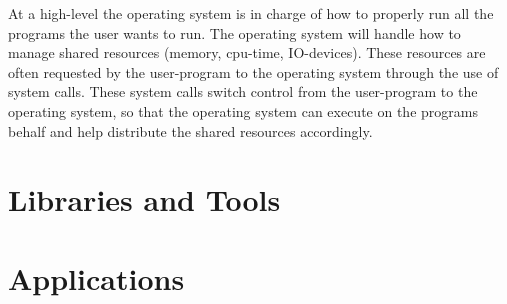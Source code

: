 At a high-level the operating system is in charge of how to properly run all the
programs the user wants to run. The operating system will handle how to manage
shared resources (memory, cpu-time, IO-devices). These resources are often
requested by the user-program to the operating system through the use of system calls.
These system calls switch control from the user-program to the operating system,
so that the operating system can execute on the programs behalf and help
distribute the shared resources accordingly.

\section{Libraries and Tools}


\section{Applications}
